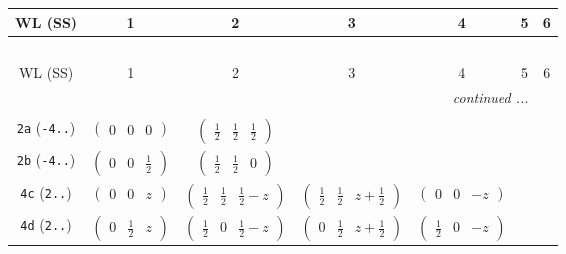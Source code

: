 \documentclass[fleqn,9pt,landscape]{jsarticle}
\begin{document}
\begin{center}
\renewcommand{\arraystretch}{1.2}
\begin{longtable}{ccccccc}
 \hline \hline
WL (SS) & 1 & 2 & 3 & 4 & 5 & 6 \\ \hline \endfirsthead

\multicolumn{6}{l}{\tablename\ \thetable{}} \\
 \hline \hline
WL (SS) & 1 & 2 & 3 & 4 & 5 & 6 \\ \hline \endhead

 \hline \hline
\multicolumn{6}{r}{\footnotesize\it continued ...} \\ \endfoot

 \hline \hline
\multicolumn{6}{r}{} \\ \endlastfoot

{\tt 2a} ({\tt -4..}) & $ \begin{pmatrix} 0 & 0 & 0 \end{pmatrix} $ & $ \begin{pmatrix} \frac{1}{2} & \frac{1}{2} & \frac{1}{2} \end{pmatrix} $ & $  $ & $  $ & $  $ & $  $ \\ \hline
{\tt 2b} ({\tt -4..}) & $ \begin{pmatrix} 0 & 0 & \frac{1}{2} \end{pmatrix} $ & $ \begin{pmatrix} \frac{1}{2} & \frac{1}{2} & 0 \end{pmatrix} $ & $  $ & $  $ & $  $ & $  $ \\ \hline
{\tt 4c} ({\tt 2..}) & $ \begin{pmatrix} 0 & 0 & z \end{pmatrix} $ & $ \begin{pmatrix} \frac{1}{2} & \frac{1}{2} & \frac{1}{2} - z \end{pmatrix} $ & $ \begin{pmatrix} \frac{1}{2} & \frac{1}{2} & z + \frac{1}{2} \end{pmatrix} $ & $ \begin{pmatrix} 0 & 0 & - z \end{pmatrix} $ & $  $ & $  $ \\ \hline
{\tt 4d} ({\tt 2..}) & $ \begin{pmatrix} 0 & \frac{1}{2} & z \end{pmatrix} $ & $ \begin{pmatrix} \frac{1}{2} & 0 & \frac{1}{2} - z \end{pmatrix} $ & $ \begin{pmatrix} 0 & \frac{1}{2} & z + \frac{1}{2} \end{pmatrix} $ & $ \begin{pmatrix} \frac{1}{2} & 0 & - z \end{pmatrix} $ & $  $ & $  $ \\ \hline

\end{longtable}
\end{center}
\end{document}

